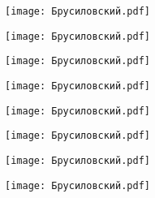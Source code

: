 \documentclass[main.tex]{subfiles}
\begin{document}
\begin{center}
\texttt{[image: Брусиловский.pdf]}
\end{center}

\begin{center}
\texttt{[image: Брусиловский.pdf]}
\end{center}

\begin{center}
\texttt{[image: Брусиловский.pdf]}
\end{center}

\begin{center}
\texttt{[image: Брусиловский.pdf]}
\end{center}

\begin{center}
\texttt{[image: Брусиловский.pdf]}
\end{center}

\begin{center}
\texttt{[image: Брусиловский.pdf]}
\end{center}

\begin{center}
\texttt{[image: Брусиловский.pdf]}
\end{center}

\begin{center}
\texttt{[image: Брусиловский.pdf]}
\end{center}
\end{document}
